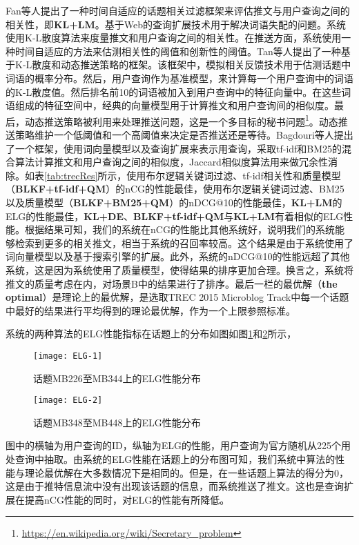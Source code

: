 Fan等人提出了一种时间自适应的话题相关过滤框架来评估推文与用户查询之间的相关性，即\textbf{KL+LM}。基于Web的查询扩展技术用于解决词语失配的问题。系统使用K-L散度算法来度量推文和用户查询之间的相关性。在推送方面，系统使用一种时间自适应的方法来估测相关性的阈值和创新性的阈值。Tan等人提出了一种基于K-L散度和动态推送策略的框架。该框架中，模拟相关反馈技术用于估测话题中词语的概率分布。然后，用户查询作为基准模型，来计算每一个用户查询中的词语的K-L散度值。然后排名前10的词语被加入到用户查询中的特征向量中。在这些词语组成的特征空间中，经典的向量模型用于计算推文和用户查询间的相似度。最后，动态推送策略被利用来处理推送问题，这是一个多目标的秘书问题\footnote{\url{https://en.wikipedia.org/wiki/Secretary_problem}}。动态推送策略维护一个低阈值和一个高阈值来决定是否推送还是等待。Bagdouri等人提出了一个框架，使用词向量模型以及查询扩展来表示用查询，采取tf-idf和BM25的混合算法计算推文和用户查询之间的相似度，Jaccard相似度算法用来做冗余性消除。如表\ref{tab:trecRes}所示，使用布尔逻辑关键词过滤、tf-idf相关性和质量模型（\textbf{BLKF+tf-idf+QM}）的nCG的性能最佳，使用布尔逻辑关键词过滤、BM25以及质量模型（\textbf{BLKF+BM25+QM}）的nDCG@10的性能最佳，\textbf{KL+LM}的ELG的性能最佳，\textbf{KL+DE}、\textbf{BLKF+tf-idf+QM}与\textbf{KL+LM}有着相似的ELG性能。根据结果可知，我们的系统在nCG的性能比其他系统好，说明我们的系统能够检索到更多的相关推文，相当于系统的召回率较高。这个结果是由于系统使用了词向量模型以及基于搜索引擎的扩展。此外，系统的nDCG@10的性能远超了其他系统，这是因为系统使用了质量模型，使得结果的排序更加合理。换言之，系统将推文的质量考虑在内，对场景B中的结果进行了排序。最后一栏的最优解（\textbf{the optimal}）是理论上的最优解，是选取TREC 2015 Microblog Track中每一个话题中最好的结果进行平均得到的理论最优解，作为一个上限参照标准。

系统的两种算法的ELG性能指标在话题上的分布如图如图\ref{fig:elg1}和\ref{fig:elg2}所示，
\begin{figure}[!htbp]
  \centering
  \texttt{[image: ELG-1]}
  \caption{话题MB226至MB344上的ELG性能分布}
  \label{fig:elg1}
\end{figure}
\begin{figure}[!htbp]
  \centering
  \texttt{[image: ELG-2]}
  \caption{话题MB348至MB448上的ELG性能分布}
  \label{fig:elg2}
\end{figure}
图中的横轴为用户查询的ID，纵轴为ELG的性能，用户查询为官方随机从225个用处查询中抽取。由系统的ELG性能在话题上的分布图可知，我们系统中算法的性能与理论最优解在大多数情况下是相同的。但是，在一些话题上算法的得分为0，这是由于推特信息流中没有出现该话题的信息，而系统推送了推文。这也是查询扩展在提高nCG性能的同时，对ELG的性能有所降低。

